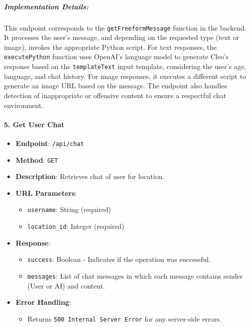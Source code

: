 \hypertarget{implementation-details}{%
\subparagraph{Implementation Details:}\label{implementation-details}}

This endpoint corresponds to the \texttt{getFreeformMessage} function in
the backend. It processes the user's message, and depending on the
requested type (text or image), invokes the appropriate Python script.
For text responses, the \texttt{executePython} function uses OpenAI's
language model to generate Cleo's response based on the
\texttt{templateText} input template, considering the user's age,
language, and chat history. For image responses, it executes a different
script to generate an image URL based on the message. The endpoint also
handles detection of inappropriate or offensive content to ensure a
respectful chat environment.

\hypertarget{get-user-chat}{%
\paragraph{5. Get User Chat}\label{get-user-chat}}

\begin{itemize}
\tightlist
\item
  \textbf{Endpoint}: \texttt{/api/chat}
\item
  \textbf{Method}: \texttt{GET}
\item
  \textbf{Description}: Retrieves chat of user for location.
\item
  \textbf{URL Parameters}:

  \begin{itemize}
  \tightlist
  \item
    \texttt{username}: String (required)
  \item
    \texttt{location\_id}: Integer (required)
  \end{itemize}
\item
  \textbf{Response}:

  \begin{itemize}
  \tightlist
  \item
    \texttt{success}: Boolean - Indicates if the operation was
    successful.
  \item
    \texttt{messages}: List of chat messages in which each message
    contains sender (User or AI) and content.
  \end{itemize}
\item
  \textbf{Error Handling}:

  \begin{itemize}
  \tightlist
  \item
    Returns \texttt{500\ Internal\ Server\ Error} for any server-side
    errors.
  \end{itemize}
\end{itemize}

